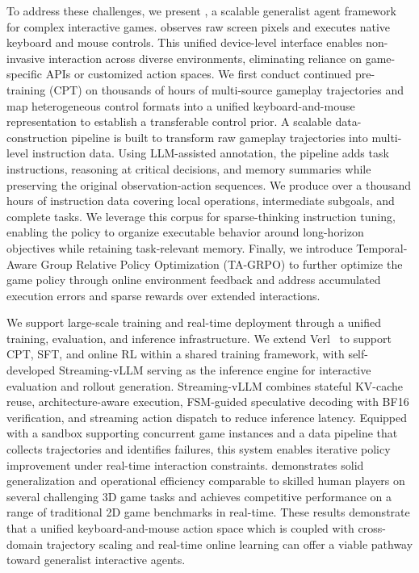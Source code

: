 To address these challenges, we present \ourmodel, a scalable generalist agent framework for complex interactive games. \ourmodel observes raw screen pixels and executes native keyboard and mouse controls. This unified device-level interface enables non-invasive interaction across diverse environments, eliminating reliance on game-specific APIs or customized action spaces. We first conduct continued pre-training (CPT) on thousands of hours of multi-source gameplay trajectories and map heterogeneous control formats into a unified keyboard-and-mouse representation to establish a transferable control prior. A scalable data-construction pipeline is built to transform raw gameplay trajectories into multi-level instruction data. Using LLM-assisted annotation, the pipeline adds task instructions, reasoning at critical decisions, and memory summaries while preserving the original observation-action sequences. We produce over a thousand hours of instruction data covering local operations, intermediate subgoals, and complete tasks. We leverage this corpus for sparse-thinking instruction tuning, enabling the policy to organize executable behavior around long-horizon objectives while retaining task-relevant memory. Finally, we introduce Temporal-Aware Group Relative Policy Optimization (TA-GRPO) to further optimize the game policy through online environment feedback and address accumulated execution errors and sparse rewards over extended interactions.

We support large-scale training and real-time deployment through a unified training, evaluation, and inference infrastructure. We extend Verl~\cite{sheng2024hybridflow} to support CPT, SFT, and online RL within a shared training framework, with self-developed Streaming-vLLM serving as the inference engine for interactive evaluation and rollout generation. Streaming-vLLM combines stateful KV-cache reuse, architecture-aware execution, FSM-guided speculative decoding with BF16 verification, and streaming action dispatch to reduce inference latency. Equipped with a sandbox supporting concurrent game instances and a data pipeline that collects trajectories and identifies failures, this system enables iterative policy improvement under real-time interaction constraints. \ourmodel demonstrates solid generalization and operational efficiency comparable to skilled human players on several challenging 3D game tasks and achieves competitive performance on a range of traditional 2D game benchmarks in real-time. These results demonstrate that a unified keyboard-and-mouse action space which is coupled with cross-domain trajectory scaling and real-time online learning can offer a viable pathway toward generalist interactive agents.

